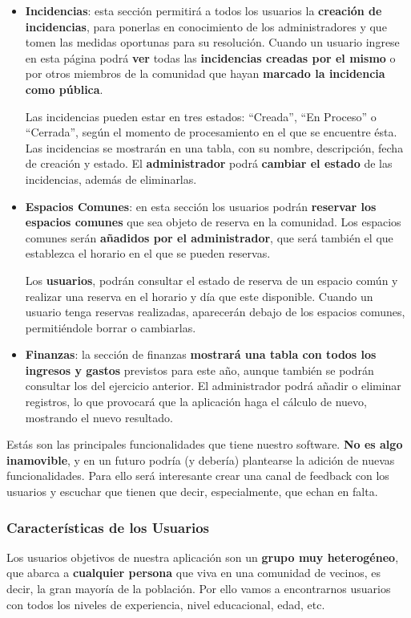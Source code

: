 \begin{itemize}
\begin{itemize}
 		\item \textbf{Incidencias}: esta sección permitirá a todos los usuarios la \textbf{creación de incidencias}, para ponerlas en conocimiento de los administradores y que tomen las medidas oportunas para su resolución. Cuando un usuario ingrese en esta página podrá \textbf{ver} todas las \textbf{incidencias creadas por el mismo} o por otros miembros de la comunidad que hayan \textbf{marcado la incidencia como pública}. 
 		
 		Las incidencias pueden estar en tres estados: ``Creada'', ``En Proceso'' o ``Cerrada'', según el momento de procesamiento en el que se encuentre ésta. Las incidencias se mostrarán en una tabla, con su nombre, descripción, fecha de creación y estado. El \textbf{administrador} podrá \textbf{cambiar el estado} de las incidencias, además de eliminarlas. 
 		
 		\item \textbf{Espacios Comunes}: en esta sección los usuarios podrán \textbf{reservar los espacios comunes} que sea objeto de reserva en la comunidad. Los espacios comunes serán \textbf{añadidos por el administrador}, que será también el que establezca el horario en el que se pueden reservas. 
 		
 		Los \textbf{usuarios}, podrán consultar el estado de reserva de un espacio común y realizar una reserva en el horario y día que este disponible. Cuando un usuario tenga reservas realizadas, aparecerán debajo de los espacios comunes, permitiéndole borrar o cambiarlas.
 		
 		\item \textbf{Finanzas}: la sección de finanzas \textbf{mostrará una tabla con todos los ingresos y gastos} previstos para este año, aunque también se podrán consultar los del ejercicio anterior. El administrador podrá añadir o eliminar registros, lo que provocará que la aplicación haga el cálculo de nuevo, mostrando el nuevo resultado.
 	\end{itemize}
\end{itemize}

Estás son las principales funcionalidades que tiene nuestro software. \textbf{No es algo inamovible}, y en un futuro podría (y debería) plantearse la adición de nuevas funcionalidades. Para ello será interesante crear una canal de feedback con los usuarios y escuchar que tienen que decir, especialmente, que echan en falta.

\subsubsection{Características de los Usuarios}
Los usuarios objetivos de nuestra aplicación son un \textbf{grupo muy heterogéneo}, que abarca a \textbf{cualquier persona} que viva en una comunidad de vecinos, es decir, la gran mayoría de la población. Por ello vamos a encontrarnos usuarios con todos los niveles de experiencia, nivel educacional, edad, etc. 


